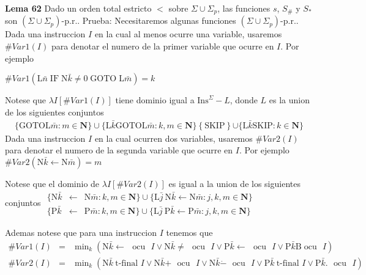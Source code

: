 \textbf{Lema 62} Dado un orden total estricto \( < \) sobre \(\Sigma \cup \Sigma _{p}\), las funciones \(s\), \(S_{\#}\) y \(S_{\ast } \) son \((\Sigma \cup \Sigma _{p})\)-p.r..
Prueba: Necesitaremos algunas funciones \((\Sigma \cup \Sigma _{p})\)-p.r.. Dada una instruccion \(I\) en la cual al menos ocurre una variable, usaremos \(\#Var1(I)\) para denotar el numero de la primer variable que ocurre en \(I\). Por ejemplo

\(\displaystyle \#Var1\left( \mathrm{L}\bar{n}\;\mathrm{IF\;N}\bar{k}\neq 0\;\mathrm{GOTO\;L} \bar{m}\right) =k \)

Notese que \(\lambda I[\#Var1(I)]\) tiene dominio igual a \(\mathrm{Ins} ^{\Sigma }-L\), donde \(L\) es la union de los siguientes conjuntos \begin{gather*} \{\mathrm{GOTO L}\bar{m}:m\in \mathbf{N\}\cup }\{\mathrm{L}\bar{k} \mathrm{ GOTO L}\bar{m}:k,m\in \mathbf{N\}}
\left\{ \mathrm{SKIP}\right\} \mathbf{\cup }\{\mathrm{L}\bar{k} \mathrm{SKIP }:k\in \mathbf{N\}} \end{gather*} Dada una instruccion \(I\) en la cual ocurren dos variables, usaremos \( \#Var2(I)\) para denotar el numero de la segunda variable que ocurre en \(I\). Por ejemplo
\(\displaystyle \#Var2\left( \mathrm{N}\bar{k}\leftarrow \mathrm{N}\bar{m}\right) =m \)

Notese que el dominio de \(\lambda I[\#Var2(I)]\) es igual a la union de los siguientes conjuntos
\(\displaystyle \begin{array}{rcl} \{\mathrm{N}\bar{k} & \leftarrow & \mathrm{N}\bar{m}:k,m\in \mathbf{N\}\cup }\{ \mathrm{L}\bar{j}\ \mathrm{N}\bar{k}\leftarrow \mathrm{N}\bar{m}:j,k,m\in \mathbf{N\}} \\ \{\mathrm{P}\bar{k} & \leftarrow & \mathrm{P}\bar{m}:k,m\in \mathbf{N\}\cup }\{ \mathrm{L}\bar{j}\ \mathrm{P}\bar{k}\leftarrow \mathrm{P}\bar{m}:j,k,m\in \mathbf{N\}} \end{array} \)

Ademas notese que para una instruccion \(I\) tenemos que
\(\displaystyle \begin{array}{rcl} \#Var1(I) & =& \min_{k}(\mathrm{N}\bar{k}\mathrm{\leftarrow }\text{ }\mathrm{ ocu}\text{ }I\vee \mathrm{N}\bar{k}\mathrm{\neq }\text{ }\mathrm{ocu}\text{ } I\vee \mathrm{P}\bar{k}\mathrm{\leftarrow }\text{ }\mathrm{ocu}\text{ }I\vee \mathrm{P}\bar{k}\mathrm{B}\;\mathrm{ocu}\text{ }I) \\ \#Var2(I) & =& \min_{k}(\mathrm{N}\bar{k}\ \text{t-final }I\vee \mathrm{N}\bar{ k}\mathrm{+}\text{ }\mathrm{ocu}\text{ }I\vee \mathrm{N}\bar{k}\mathrm{\dot{- }}\text{ }\mathrm{ocu}\text{ }I\vee \mathrm{P}\bar{k}\ \text{t-final }I\vee \mathrm{P}\bar{k}.\text{ }\mathrm{ocu}\text{ }I) \end{array} \)

